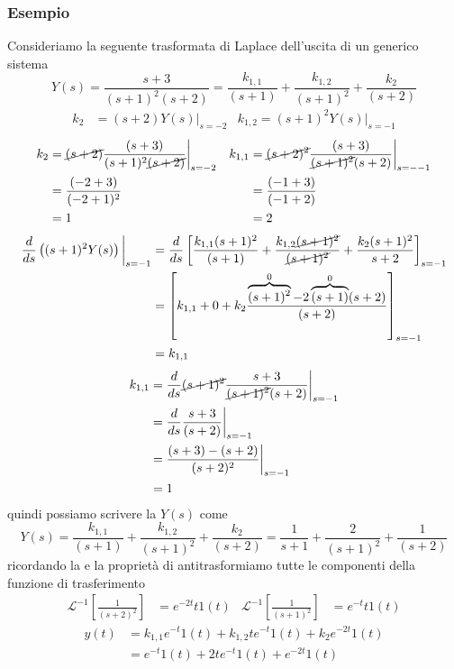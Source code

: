 \documentclass{article}
\numberwithin{equation}{subsection}
\begin{document}
\subsubsection{Esempio}
Consideriamo la seguente trasformata di Laplace dell'uscita di un generico sistema
\[
    Y(s) = \frac{s+3}{(s+1)^2(s+2)} = \frac{k_{1,1}}{(s+1)} + \frac{k_{1,2}}{(s+1)^2} + \frac{k_{2}}{(s+2)}   
\]
\begin{align*}
    k_2 &= (s+2)Y(s) \big|_{s=-2} & k_{1,2} = (s+1)^2 Y(s) \big|_{s=-1}
\end{align*}
\begin{align*}
    k_2 
    &= \cancel{(s+2)} \frac{(s+3)}{(s+1)^2\cancel{(s+2)}} \bigg|_{s=-2}
    &
    k_{1,1}
    &= \cancel{(s+2)^2} \frac{(s+3)}{\cancel{(s+1)^2}(s+2)} \bigg|_{s=--1}
    \\
    &= \frac{(-2+3)}{(-2+1)^2}
    &
    &= \frac{(-1+3)}{(-1+2)}
    \\
    &=1
    &
    &=2
\end{align*}
\begin{align*}
    \frac{d}{ds}\left((s+1)^2 Y(s)\right)\bigg|_{s=-1} 
    &= \frac{d}{ds} \left[ \frac{k_{1,1}(s+1)^2}{(s+1)} + \frac{k_{1,2}\cancel{(s+1)^2}}{\cancel{(s+1)^2}} + \frac{k_2(s+1)^2}{s+2}\right]_{s=-1}
    \\
    &= \left[k_{1,1} + 0 + k_2 \frac{\overbrace{(s+1)^2}^{0}-2\overbrace{(s+1)}^{0}(s+2)}{(s+2)}\right]_{s=-1}
    \\
    &= k_{1,1}
\end{align*}
\begin{align*}
    k_{1,1} 
    &= \frac{d}{ds} \cancel{(s+1)^2} \frac{s+3}{\cancel{(s+1)^2}(s+2)} \bigg|_{s=-1}
    \\
    &= \frac{d}{ds}\frac{s+3}{(s+2)} \bigg|_{s=-1}
    \\
    &= \frac{(s+3)-(s+2)}{(s+2)^2}\bigg|_{s=-1}
    \\
    &= 1
\end{align*}
quindi possiamo scrivere la $Y(s)$ come
\[
    Y(s) = \frac{k_{1,1}}{(s+1)} + \frac{k_{1,2}}{(s+1)^2} + \frac{k_{2}}{(s+2)} = \frac{1}{s+1} + \frac{2}{(s+1)^2} + \frac{1}{(s+2)}
\]
ricordando la  e la proprietà di  antitrasformiamo tutte le componenti della funzione di trasferimento
\begin{align*}
    \mathcal{L}^{-1}\left[\frac{1}{(s+2)^2}\right] &= e^{-2t} t 1(t) & \mathcal{L}^{-1}\left[\frac{1}{(s+1)^2}\right] &= e^{-t} t 1(t)
\end{align*}
\begin{align*}
    y(t) 
    &= k_{1,1}e^{-t}1(t) + k_{1,2} t e^{-t}1(t) + k_{2}e^{-2t}1(t)
    \\
    &= e^{-t}1(t) + 2 t e^{-t}1(t) +e^{-2t}1(t)
\end{align*}
\end{document}
